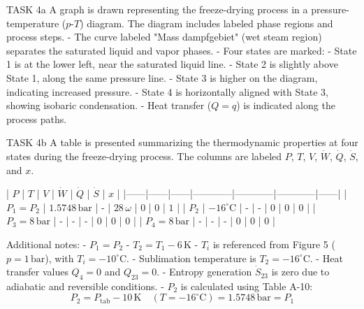 TASK 4a  
A graph is drawn representing the freeze-drying process in a pressure-temperature (\(p\)-\(T\)) diagram. The diagram includes labeled phase regions and process steps.  
- The curve labeled "Mass dampfgebiet" (wet steam region) separates the saturated liquid and vapor phases.  
- Four states are marked:  
  - State 1 is at the lower left, near the saturated liquid line.  
  - State 2 is slightly above State 1, along the same pressure line.  
  - State 3 is higher on the diagram, indicating increased pressure.  
  - State 4 is horizontally aligned with State 3, showing isobaric condensation.  
- Heat transfer (\(Q = q\)) is indicated along the process paths.  

TASK 4b  
A table is presented summarizing the thermodynamic properties at four states during the freeze-drying process. The columns are labeled \(P\), \(T\), \(V\), \(\dot{W}\), \(\dot{Q}\), \(\dot{S}\), and \(x\).  

| \(P\) | \(T\) | \(V\) | \(\dot{W}\) | \(\dot{Q}\) | \(\dot{S}\) | \(x\) |  
|------|------|------|------------|------------|------------|------|  
| \(P_1 = P_2\) | \(1.5748 \, \text{bar}\) | - | \(28 \, \omega\) | \(0\) | \(0\) | \(1\) |  
| \(P_2\) | \(-16^\circ \text{C}\) | - | - | \(0\) | \(0\) | \(0\) |  
| \(P_3 = 8 \, \text{bar}\) | - | - | - | \(0\) | \(0\) | \(0\) |  
| \(P_4 = 8 \, \text{bar}\) | - | - | - | \(0\) | \(0\) | \(0\) |  

Additional notes:  
- \(P_1 = P_2\)  
- \(T_2 = T_1 - 6 \, \text{K}\)  
- \(T_i\) is referenced from Figure 5 (\(p = 1 \, \text{bar}\)), with \(T_i = -10^\circ \text{C}\).  
- Sublimation temperature is \(T_2 = -16^\circ \text{C}\).  
- Heat transfer values \(Q_{4} = 0\) and \(Q_{23} = 0\).  
- Entropy generation \(\dot{S}_{23}\) is zero due to adiabatic and reversible conditions.  
- \(P_2\) is calculated using Table A-10:  
  \[
  P_2 = P_{\text{tab}} - 10 \, \text{K} \quad (T = -16^\circ \text{C}) = 1.5748 \, \text{bar} = P_1
  \]